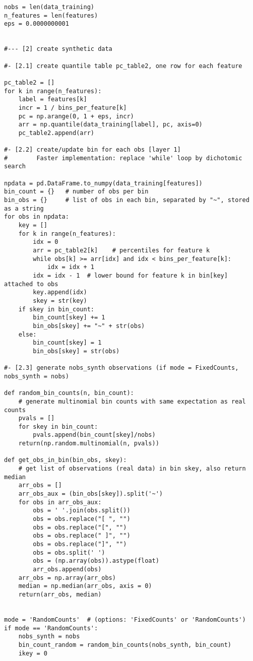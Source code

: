\documentclass[oneside,10pt]{book}
\begin{document}
\begin{lstlisting}
nobs = len(data_training)
n_features = len(features)
eps = 0.0000000001


#--- [2] create synthetic data

#- [2.1] create quantile table pc_table2, one row for each feature

pc_table2 = []
for k in range(n_features):
    label = features[k]
    incr = 1 / bins_per_feature[k]
    pc = np.arange(0, 1 + eps, incr)
    arr = np.quantile(data_training[label], pc, axis=0)
    pc_table2.append(arr)

#- [2.2] create/update bin for each obs [layer 1]
#        Faster implementation: replace 'while' loop by dichotomic search

npdata = pd.DataFrame.to_numpy(data_training[features])
bin_count = {}   # number of obs per bin
bin_obs = {}     # list of obs in each bin, separated by "~", stored as a string
for obs in npdata:
    key = []
    for k in range(n_features):
        idx = 0
        arr = pc_table2[k]    # percentiles for feature k
        while obs[k] >= arr[idx] and idx < bins_per_feature[k]:
            idx = idx + 1
        idx = idx - 1  # lower bound for feature k in bin[key] attached to obs
        key.append(idx)
        skey = str(key)
    if skey in bin_count:
        bin_count[skey] += 1
        bin_obs[skey] += "~" + str(obs)
    else:
        bin_count[skey] = 1
        bin_obs[skey] = str(obs)

#- [2.3] generate nobs_synth observations (if mode = FixedCounts, nobs_synth = nobs)

def random_bin_counts(n, bin_count):
    # generate multinomial bin counts with same expectation as real counts
    pvals = []
    for skey in bin_count:
        pvals.append(bin_count[skey]/nobs)
    return(np.random.multinomial(n, pvals))

def get_obs_in_bin(bin_obs, skey):
    # get list of observations (real data) in bin skey, also return median
    arr_obs = []
    arr_obs_aux = (bin_obs[skey]).split('~')
    for obs in arr_obs_aux:
        obs = ' '.join(obs.split())
        obs = obs.replace("[ ", "")
        obs = obs.replace("[", "")
        obs = obs.replace(" ]", "")
        obs = obs.replace("]", "")
        obs = obs.split(' ')
        obs = (np.array(obs)).astype(float)
        arr_obs.append(obs)
    arr_obs = np.array(arr_obs)
    median = np.median(arr_obs, axis = 0)
    return(arr_obs, median)


mode = 'RandomCounts'  # (options: 'FixedCounts' or 'RandomCounts')
if mode == 'RandomCounts':
    nobs_synth = nobs
    bin_count_random = random_bin_counts(nobs_synth, bin_count)
    ikey = 0


\end{lstlisting}
\end{document}
